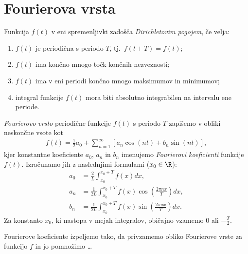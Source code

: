 \section{Fourierova vrsta}
%

Funkcija $f(t)$ v eni spremenljivki zadošča \emph{Dirichletovim pogojem}, če velja:
\begin{enumerate}
\item $f(t)$ je periodična s periodo $T$, tj.\ $f(t + T) = f(t)$; 
\item $f(t)$ ima končno mnogo točk končnih nezveznosti;
\item $f(t)$ ima v eni periodi končno mnogo maksimumov in minimumov;
\item integral funkcije $f(t)$ mora biti absolutno integrabilen na intervalu ene periode.
\end{enumerate}
%
\begin{definicija}
\emph{Fourierovo vrsto} periodične funkcije $f(t)$ s periodo $T$ zapišemo v obliki neskončne vsote kot
\begin{align}
f(t) = \frac{1}{2}a_0 + \sum_{n=1}^{\infty} [a_n \cos (nt) + b_n\sin (nt)],
\end{align}
kjer konstantne koeficiente $a_0$, $a_n$ in $b_n$ imenujemo \emph{Fourierovi koeficienti} funkcije $f(t)$. Izračunamo jih z naslednjimi formulami ($x_0 \in \R$):
\begin{align}
a_0 & = \frac{2}{L}\int_{x_0}^{x_0+T}f(x) dx, \\
a_n & = \frac{1}{2L}\int_{x_0}^{x_0+T}f(x) \cos\left(\frac{2\pi n x}{T}\right) dx, \\
b_n & = \frac{1}{2L}\int_{x_0}^{x_0+T}f(x) \sin\left(\frac{2\pi n x}{T}\right) dx.
\end{align}
Za konstanto $x_0$, ki nastopa v mejah integralov, običajno vzamemo 0 ali $-\frac{T}{2}$.
\end{definicija}
%
Fourierove koeficiente izpeljemo tako, da privzamemo obliko Fourierove vrste za funkcijo $f$ in jo pomnožimo \ldots

